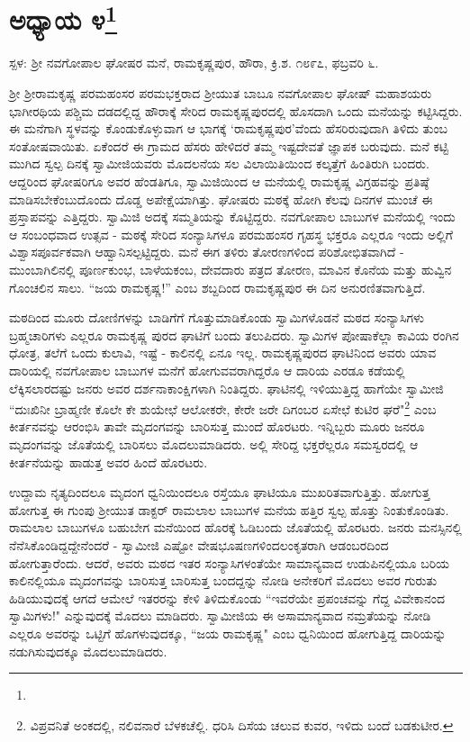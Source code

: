 \newpage

\chapter[ಅಧ್ಯಾಯ ೪]{ಅಧ್ಯಾಯ ೪\protect\footnote{}}

\centerline{ಸ್ಪಳ: ಶ‍್ರೀ ನವಗೋಪಾಲ ಘೋಷರ ಮನೆ, ರಾಮಕೃಷ್ಣಪುರ, ಹೌರಾ, ಕ್ರಿ.ಶ. ೧೮೯೭, ಫಬ್ರವರಿ ೬.}

ಶ‍್ರೀ ಶ‍್ರೀರಾಮಕೃಷ್ಣ ಪರಮಹಂಸರ ಪರಮಭಕ್ತರಾದ ಶ‍್ರೀಯುತ ಬಾಬೂ ನವಗೋಪಾಲ ಘೋಷ್ ಮಹಾಶಯರು ಭಾಗೀರಥಿಯ ಪಶ್ಚಿಮ ದಡದಲ್ಲಿದ್ದ ಹೌರಾಕ್ಕೆ ಸೇರಿದ ರಾಮಕೃಷ್ಣಪುರದಲ್ಲಿ ಹೊಸದಾಗಿ ಒಂದು ಮನೆಯನ್ನು ಕಟ್ಟಿಸಿದ್ದರು. ಈ ಮನೆಗಾಗಿ ಸ್ಥಳವನ್ನು ಕೊಂಡುಕೊಳ್ಳುವಾಗ ಆ ಭಾಗಕ್ಕೆ ‘ರಾಮಕೃಷ್ಣಪುರ’ವೆಂದು ಹೆಸರಿರುವುದಾಗಿ ತಿಳಿದು ತುಂಬ ಸಂತೋಷವಾಯಿತು. ಏಕೆಂದರೆ ಈ ಗ್ರಾಮದ ಹೆಸರು ಹೇಳಿದರೆ ತಮ್ಮ ಇಷ್ಟದೇವತೆ ಜ್ಞಾಪಕ ಬರುವುದು. ಮನೆ ಕಟ್ಟಿ ಮುಗಿದ ಸ್ವಲ್ಪ ದಿನಕ್ಕೆ ಸ್ವಾಮೀಜಿಯವರು ಮೊದಲನೆಯ ಸಲ ವಿಲಾಯಿತಿಯಿಂದ ಕಲ್ಕತ್ತೆಗೆ ಹಿಂತಿರುಗಿ ಬಂದರು. ಆದ್ದರಿಂದ ಘೋಷರಿಗೂ ಅವರ ಹೆಂಡತಿಗೂ, ಸ್ವಾಮಿಜಿಯಿಂದ ಆ ಮನೆಯಲ್ಲಿ ರಾಮಕೃಷ್ಣ ವಿಗ್ರಹವನ್ನು ಪ್ರತಿಷ್ಠೆ ಮಾಡಿಸಬೇಕೆಂಬುದೊಂದು ದೊಡ್ಡ ಅಪೇಕ್ಷೆಯಾಗಿತ್ತು. ಘೋಷರು ಮಠಕ್ಕೆ ಹೋಗಿ ಕೆಲವು ದಿನಗಳ ಮುಂಚೆ ಈ ಪ್ರಸ್ತಾಪವನ್ನು ಎತ್ತಿದ್ದರು. ಸ್ವಾಮಿಜಿ ಅದಕ್ಕೆ ಸಮ್ಮತಿಯನ್ನು ಕೊಟ್ಟಿದ್ದರು. ನವಗೋಪಾಲ ಬಾಬುಗಳ ಮನೆಯಲ್ಲಿ ಇಂದು ಆ ಸಂಬಂಧವಾದ ಉತ್ಸವ - ಮಠಕ್ಕೆ ಸೇರಿದ ಸಂನ್ಯಾಸಿಗಳೂ ಪರಮಹಂಸರ ಗೃಹಸ್ಥ ಭಕ್ತರೂ ಎಲ್ಲರೂ ಇಂದು ಅಲ್ಲಿಗೆ ವಿಶ್ವಾಸಪೂರ್ವಕವಾಗಿ ಆಹ್ವಾನಿಸಲ್ಪಟ್ಟಿದ್ದರು. ಮನೆ ಈಗ ತಳಿರು ತೋರಣಗಳಿಂದ ಪರಿಶೋಭಿತವಾಗಿದೆ - ಮುಂಬಾಗಿಲಿನಲ್ಲಿ ಪೂರ್ಣಕುಂಭ, ಬಾಳೆಯಕಂಬ, ದೇವದಾರು ಪತ್ರದ ತೋರಣ, ಮಾವಿನ ಕೊನೆಯ ಮತ್ತು ಹುವ್ವಿನ ಗೊಂಚಲಿನ ಸಾಲು. “ಜಯ ರಾಮಕೃಷ್ಣ!” ಎಂಬ ಶಬ್ದದಿಂದ ರಾಮಕೃಷ್ಣಪುರ ಈ ದಿನ ಅನುರಣಿತವಾಗುತ್ತಿದೆ.

ಮಠದಿಂದ ಮೂರು ದೋಣಿಗಳನ್ನು ಬಾಡಿಗೆಗೆ ಗೊತ್ತುಮಾಡಿಕೊಂಡು ಸ್ವಾಮಿಗಳೊಡನೆ ಮಠದ ಸಂನ್ಯಾಸಿಗಳು ಬ್ರಹ್ಮಚಾರಿಗಳು ಎಲ್ಲರೂ ರಾಮಕೃಷ್ಣ ಪುರದ ಘಾಟಿಗೆ ಬಂದು ತಲುಪಿದರು. ಸ್ವಾಮಿಗಳ ಪೋಷಾಕೆಲ್ಲಾ ಕಾವಿಯ ರಂಗಿನ ಧೋತ್ರ, ತಲೆಗೆ ಒಂದು ಕುಲಾವಿ, ಇಷ್ಟೆ - ಕಾಲಿನಲ್ಲಿ ಏನೂ ಇಲ್ಲ. ರಾಮಕೃಷ್ಣಪುರದ ಘಾಟಿನಿಂದ ಅವರು ಯಾವ ದಾರಿಯಲ್ಲಿ ನವಗೋಪಾಲ ಬಾಬುಗಳ ಮನೆಗೆ ಹೋಗುವವರಾಗಿದ್ದರೊ ಆ ದಾರಿಯ ಎರಡೂ ಕಡೆಯಲ್ಲಿ ಲೆಕ್ಕಿಸಲಾರದಷ್ಟು ಜನರು ಅವರ ದರ್ಶನಾಕಾಂಕ್ಷಿಗಳಾಗಿ ನಿಂತಿದ್ದರು. ಘಾಟಿನಲ್ಲಿ ಇಳಿಯುತ್ತಿದ್ದ ಹಾಗೆಯೇ ಸ್ವಾಮೀಜಿ “ದುಃಖಿನೀ ಬ್ರಾಹ್ಮಣೀ ಕೊಲೇ ಕೇ ಶುಯೇಛೆ ಆಲೋಕರೇ, ಕೇರೇ ಜರೇ ದಿಗಂಬರ ಏಸೇಛೆ ಕುಟಿರ ಘರೆ"\footnote{ವಿಪ್ರವನಿತೆ ಅಂಕದಲ್ಲಿ, ನಲಿವನಾರೆ ಬೆಳಕಚೆಲ್ಲಿ. ಧರಿಸಿ ದಿಸೆಯ ಚಲುವ ಕುವರ, ಇಳಿದು ಬಂದೆ ಬಡಕುಟೀರ.} ಎಂಬ ಕೀರ್ತನವನ್ನು ಆರಂಭಿಸಿ ತಾವೇ ಮೃದಂಗವನ್ನು ಬಾರಿಸುತ್ತ ಮುಂದೆ ಹೊರಟರು. ಇನ್ನಿಬ್ಬರು ಮೂರು ಜನರೂ ಮೃದಂಗವನ್ನು ಜೊತೆಯಲ್ಲಿ ಬಾರಿಸಲು ಮೊದಲುಮಾಡಿದರು. ಅಲ್ಲಿ ಸೇರಿದ್ದ ಭಕ್ತರೆಲ್ಲರೂ ಸಮಸ್ವರದಲ್ಲಿ ಆ ಕೀರ್ತನೆಯನ್ನು ಹಾಡುತ್ತ ಅವರ ಹಿಂದೆ ಹೊರಟರು.

ಉದ್ದಾಮ ನೃತ್ಯದಿಂದಲೂ ಮೃದಂಗ ಧ್ವನಿಯಿಂದಲೂ ರಸ್ತೆಯೂ ಘಾಟಿಯೂ ಮುಖರಿತವಾಗುತ್ತಿತ್ತು. ಹೋಗುತ್ತ ಹೋಗುತ್ತ ಈ ಗುಂಪು ಶ‍್ರೀಯುತ ಡಾಕ್ಟರ್ ರಾಮಲಾಲ ಬಾಬುಗಳ ಮನೆಯ ಹತ್ತಿರ ಸ್ವಲ್ಪ ಹೊತ್ತು ನಿಂತುಕೊಂಡಿತು. ರಾಮಲಾಲ ಬಾಬುಗಳೂ ಬಹುಬೇಗ ಮನೆಯಿಂದ ಹೊರಕ್ಕೆ ಓಡಿಬಂದು ಜೊತೆಯಲ್ಲಿ ಹೊರಟರು. ಜನರು ಮನಸ್ಸಿನಲ್ಲಿ ನೆನೆಸಿಕೊಂಡಿದ್ದದ್ದೇನೆಂದರೆ - ಸ್ವಾಮೀಜಿ ಎಷ್ಟೋ ವೇಷಭೂಷಣಗಳಿಂದಲಂಕೃತರಾಗಿ ಆಡಂಬರದಿಂದ ಹೋಗುತ್ತಾರೆಂದು. ಆದರೆ, ಅವರು ಮಠದ ಇತರ ಸಂನ್ಯಾಸಿಗಳಂತೆಯೇ ಸಾಮಾನ್ಯವಾದ ಉಡುಪಿನಲ್ಲಿಯೂ ಬರಿಯ ಕಾಲಿನಲ್ಲಿಯೂ ಮೃದಂಗವನ್ನು ಬಾರಿಸುತ್ತ ಬಾರಿಸುತ್ತ ಬಂದದ್ದನ್ನು ನೋಡಿ ಅನೇಕರಿಗೆ ಮೊದಲು ಅವರ ಗುರುತು ಹಿಡಿಯುವುದಕ್ಕೆ ಆಗದೆ ಆಮೇಲೆ ಇತರರನ್ನು ಕೇಳಿ ತಿಳಿದುಕೊಂಡು “ಇವರೆಯೇ ಪ್ರಪಂಚವನ್ನು ಗೆದ್ದ ವಿವೇಕಾನಂದ ಸ್ವಾಮಿಗಳು!" ಎನ್ನುವುದಕ್ಕೆ ಮೊದಲು ಮಾಡಿದರು. ಸ್ವಾಮೀಜಿಯ ಈ ಅಸಾಮಾನ್ಯವಾದ ನಮ್ರತೆಯನ್ನು ನೋಡಿ ಎಲ್ಲರೂ ಅವರನ್ನು ಒಟ್ಟಿಗೆ ಹೊಗಳುವುದಕ್ಕೂ, “ಜಯ ರಾಮಕೃಷ್ಣ" ಎಂಬ ಧ್ವನಿಯಿಂದ ಹೋಗುತ್ತಿದ್ದ ದಾರಿಯನ್ನು ನಡುಗಿಸುವುದಕ್ಕೂ ಮೊದಲುಮಾಡಿದರು.


